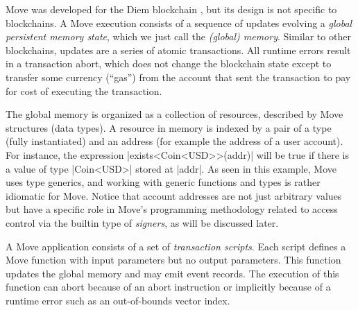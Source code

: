 

Move was developed for the Diem blockchain \cite{DIEM}, but its design is not
specific to blockchains.  A Move execution consists of a sequence of updates
evolving a \emph{global persistent memory state}, which we just call the
\emph{(global) memory}.
Similar to other blockchains, updates are a series of atomic transactions.
All runtime errors result in a transaction abort, which does not change
the blockchain state except to transfer some currency (``gas'') from the account that
sent the transaction to pay for cost of executing the transaction.

The global memory is organized as a collection of resources, described by Move
structures (data types). A resource in memory is indexed by a pair of a type
(fully instantiated) and an address (for example the address of a user
account). For instance, the expression |exists<Coin<USD>>(addr)| will be true if
there is a value of type |Coin<USD>| stored at |addr|. As seen in this example,
Move uses type generics, and working with generic functions and types is rather
idiomatic for Move.  Notice that account addresses are not just arbitrary values
but have a specific role in Move's programming methodology related to access
control via the builtin type of \emph{signers}, as will be discussed later.

A Move application consists of a set of \emph{transaction scripts}. Each
script defines a Move function with input parameters but no output
parameters.  This function updates the global memory and may emit
event records. The execution of this function can abort because of an abort
instruction or implicitly because of a runtime error such as an out-of-bounds
vector index.




